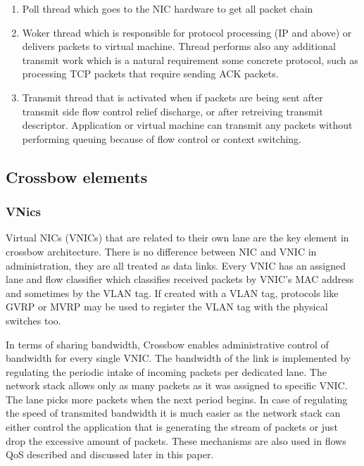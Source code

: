 \documentclass[11pt]{book}
\begin{document}
			\begin{enumerate}
				\item{Poll thread which goes to the NIC hardware to get all packet chain}
				\item{Woker thread which is responsible for protocol processing (IP and above) or delivers packets to virtual machine. Thread performs also any additional transmit work which is a natural 
				requirement some concrete protocol, such as processing TCP packets that require sending ACK packets.}
				\item{Transmit thread that is activated when if packets are being sent after transmit side flow control relief discharge, or after retreiving transmit descriptor. Application or virtual 
				machine can transmit any packets without performing queuing because of flow control or context switching.}
			\end{enumerate}

		
		\subsection{Crossbow elements}

			\subsubsection{VNics}
			Virtual NICs (VNICs) that are related to their own lane are the key element in crossbow architecture. There is no
			difference between NIC and VNIC in administration, they are all treated as data links. Every VNIC has an assigned
			lane and flow classifier which classifies received packets by VNIC's MAC address and sometimes by the VLAN tag.
			If created with a VLAN tag, protocols like GVRP or MVRP may be used to register the VLAN tag with the physical switches
			too.	

			In terms of sharing bandwidth, Crossbow enables administrative control of bandwidth for every single VNIC. The bandwidth of the link
			is implemented by regulating the periodic intake of incoming packets per dedicated lane. The network stack allows only as many packets as it was 
			assigned to specific VNIC. The lane picks more packets when the next period begins. In case of regulating the speed of transmited bandwidth it is much
			easier as the network stack can either control the application that is generating the stream of packets or just drop the excessive amount of packets.
			These mechanisms are also used in flows QoS described and discussed later in this paper.
\end{document}
